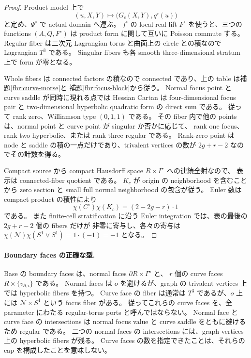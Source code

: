 \begin{proof}
Product model 上で
\[
 (u,X,Y)\longmapsto\bigl(G_c(X,Y),q^\circ(u)\bigr)
\]
と定め、$\Psi^\circ$ で actual domain へ運ぶ。
$f^\circ$ の local real lift $F^\circ$ を使うと、三つの functions $(A,Q,F^\circ)$ は
product form に関して互いに Poisson commute する。
Regular fiber は二次元 Lagrangian torus と曲面上の circle との積なので Lagrangian $T^3$ である。
Singular fibers も各 smooth three-dimensional stratum 上で form が零となる。

Whole fibers は connected factors の積なので connected であり、上の table は補題\ref{fhr:curve-morse}と
補題\ref{fhr:focus-block}から従う。
Normal focus point と curve saddle が同時に現れる点では Hessian Cartan は
four-dimensional focus pair と two-dimensional hyperbolic quadratic form の direct sum である。
従って rank zero、Williamson type $(0,1,1)$ である。
その fiber 内で他の points は、normal point と curve point が singular か否かに応じて、
rank one focus、rank two hyperbolic、または rank three regular である。
Rank-zero point は node と saddle の積の一点だけであり、trivalent vertices の数が $2g+r-2$ なのでその計数を得る。

Compact source から compact Hausdorff space $R\times\Gamma^\circ$ への連続全射なので、
表示は connected-fiber quotient である。
$K_c$ が origin の neighborhood を含むことから zero section と small full normal neighborhood の包含が従う。
Euler 数は compact product の積性により
\[
 \chi(C^\circ)\chi(K_c)=(2-2g-r)\cdot1
\]
である。
また finite-cell stratification に沿う Euler integration では、表の最後の $2g+r-2$ 個の fibers だけが
非零に寄与し、各々の寄与は $\chi(\mathcal N)\chi(S^1\vee S^1)=1\cdot(-1)=-1$ となる。
\end{proof}

\paragraph{Boundary faces の正確な型.}
Base の boundary faces は、normal faces $\partial R\times\Gamma^\circ$ と、
$r$ 個の curve faces $R\times\{v_{\partial,i}\}$ である。
Normal faces は $o$ を避けるが、graph の trivalent vertices 上では hyperbolic fibers を持つ。
Curve face の fiber は通常は $T^3$ であるが、$o$ 上には $\mathcal N\times S^1$ という focus fiber がある。
従ってこれらの curve faces を、全 parameter にわたる regular-torus ports と呼んではならない。
Normal face と curve face の intersections は normal focus value と curve saddle をともに避けるため regular である。
二つの normal faces の intersections には、graph vertices 上の hyperbolic fibers が残る。
Curve faces の数を指定できたことは、それらの cap を構成したことを意味しない。

